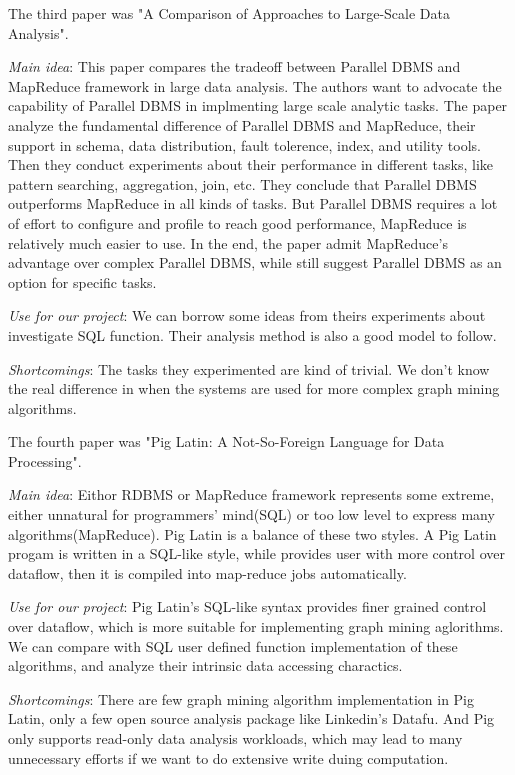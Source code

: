 The third paper was "A Comparison of Approaches to Large-Scale Data Analysis".
\cite{olston2008pig}
\begin{itemize*}
\item {\em Main idea}: 
    This paper compares the tradeoff between Parallel DBMS and MapReduce framework in large data analysis. The authors want to advocate the capability of Parallel DBMS in implmenting large scale analytic tasks. The paper analyze the fundamental difference of Parallel DBMS and MapReduce, their support in schema, data distribution, fault tolerence, index, and utility tools. Then they conduct experiments about their performance in different tasks, like pattern searching, aggregation, join, etc. They conclude that Parallel DBMS outperforms MapReduce in all kinds of tasks. But Parallel DBMS requires a lot of effort to configure and profile to reach good performance, MapReduce is relatively much easier to use. In the end, the paper admit MapReduce's advantage over complex Parallel DBMS, while still suggest Parallel DBMS as an option for specific tasks.
\item {\em Use for our project}:
    We can borrow some ideas from theirs experiments about investigate SQL function. Their analysis method is also a good model to follow.
\item {\em Shortcomings}:
    The tasks they experimented are kind of trivial. We don't know the real difference in when the systems are used for more complex graph mining algorithms.
\end{itemize*}

The fourth paper was "Pig Latin: A Not-So-Foreign Language for Data Processing".
\cite{pavlo2009comparison}
\begin{itemize*}
\item {\em Main idea}: 
    Eithor RDBMS or MapReduce framework represents some extreme, either unnatural for programmers' mind(SQL) or too low level to express many algorithms(MapReduce). Pig Latin is a balance of these two styles. A Pig Latin progam is written in a SQL-like style, while provides user with more control over dataflow, then it is compiled into map-reduce jobs automatically.
\item {\em Use for our project}:
    Pig Latin's SQL-like syntax provides finer grained control over dataflow, which is more suitable for implementing graph mining aglorithms. We can compare with SQL user defined function implementation of these algorithms, and analyze their intrinsic data accessing charactics.
\item {\em Shortcomings}:
    There are few graph mining algorithm implementation in Pig Latin, only a few open source analysis package like Linkedin's Datafu. And Pig only supports read-only data analysis workloads, which may lead to many unnecessary efforts if we want to do extensive write duing computation.
\end{itemize*}

